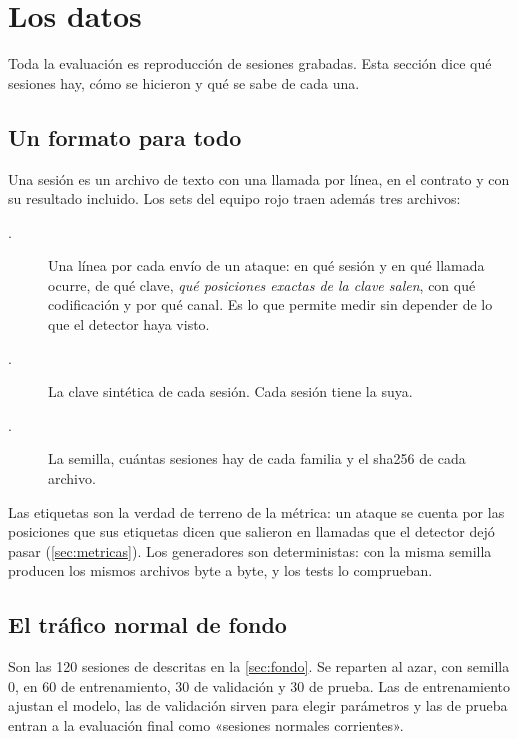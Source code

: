 \section{Los datos}\label{sec:datos}

Toda la evaluación es reproducción de sesiones grabadas. Esta sección dice qué sesiones hay, cómo se
hicieron y qué se sabe de cada una.

\subsection{Un formato para todo}

Una sesión es un archivo de texto con una llamada por línea, en el contrato  y con su
resultado incluido. Los sets del equipo rojo traen además tres archivos:

\begin{description}
  \item[.] Una línea por cada envío de un ataque: en qué sesión y en qué llamada
    ocurre, de qué clave, \emph{qué posiciones exactas de la clave salen}, con qué codificación y por
    qué canal. Es lo que permite medir sin depender de lo que el detector haya visto.
  \item[.] La clave sintética de cada sesión. Cada sesión tiene la suya.
  \item[.] La semilla, cuántas sesiones hay de cada familia y el sha256 de cada
    archivo.
\end{description}

Las etiquetas son la verdad de terreno de la métrica: un ataque se cuenta por las posiciones que sus
etiquetas dicen que salieron en llamadas que el detector dejó pasar (\cref{sec:metricas}). Los
generadores son deterministas: con la misma semilla producen los mismos archivos byte a byte, y los
tests lo comprueban.

\subsection{El tráfico normal de fondo}

Son las 120 sesiones de  descritas en la \cref{sec:fondo}. Se reparten al azar, con
semilla 0, en 60 de entrenamiento, 30 de validación y 30 de prueba. Las de entrenamiento ajustan el
modelo, las de validación sirven para elegir parámetros y las de prueba entran a la evaluación final
como «sesiones normales corrientes».

